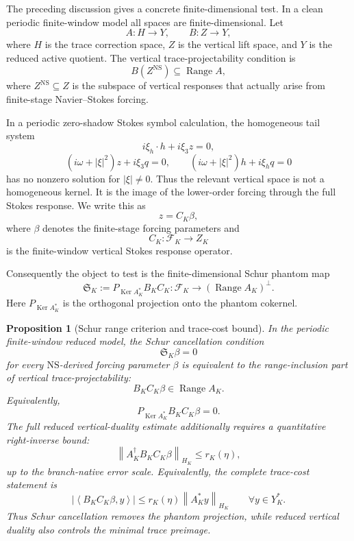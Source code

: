 \documentclass[11pt]{article}
\numberwithin{equation}{section}
\newtheorem{proposition}[theorem]{Proposition}
\DeclareMathOperator{\Range}{Range}
\DeclareMathOperator{\Ker}{Ker}
\newcommand{\NS}{\mathrm{NS}}
\newcommand{\norm}[2]{\left\|#1\right\|_{#2}}
\newcommand{\ip}[2]{\left\langle #1,#2\right\rangle}
\begin{document}
The preceding discussion gives a concrete finite-dimensional test.  In a clean periodic finite-window model all spaces are finite-dimensional.  Let
\[
        A:H\to Y,
        \qquad B:Z\to Y,
\]
where \(H\) is the trace correction space, \(Z\) is the vertical lift space, and \(Y\) is the reduced active quotient.  The vertical trace-projectability condition is
\[
        B(Z^{\NS})\subseteq\Range A,
\]
where \(Z^{\NS}\subseteq Z\) is the subspace of vertical responses that actually arise from finite-stage Navier--Stokes forcing.

In a periodic zero-shadow Stokes symbol calculation, the homogeneous tail system
\[
        i\xi_h\cdot h+i\xi_3z=0,
\]
\[
        (i\omega+|\xi|^2)z+i\xi_3q=0,
        \qquad
        (i\omega+|\xi|^2)h+i\xi_hq=0
\]
has no nonzero solution for \(|\xi|\ne0\).  Thus the relevant vertical space is not a homogeneous kernel.  It is the image of the lower-order forcing through the full Stokes response.  We write this as
\[
        z=C_K\beta,
\]
where \(\beta\) denotes the finite-stage forcing parameters and
\[
        C_K:\mathcal F_K\to Z_K
\]
is the finite-window vertical Stokes response operator.

Consequently the object to test is the finite-dimensional Schur phantom map
\begin{equation}\label{eq:Schur-phantom-map}
        \mathfrak S_K
        :=P_{\Ker A_K^*}B_KC_K:
        \mathcal F_K\to (\Range A_K)^\perp.
\end{equation}
Here \(P_{\Ker A_K^*}\) is the orthogonal projection onto the phantom cokernel.

\begin{proposition}[Schur range criterion and trace-cost bound]\label{prop:Schur-criterion}
In the periodic finite-window reduced model, the Schur cancellation condition
\[
        \mathfrak S_K\beta=0
\]
for every \(\NS\)-derived forcing parameter \(\beta\) is equivalent to the \emph{range-inclusion} part of vertical trace-projectability:
\[
        B_KC_K\beta\in\Range A_K.
\]
Equivalently,
\[
        P_{\Ker A_K^*}B_KC_K\beta=0.
\]
The full reduced vertical-duality estimate additionally requires a quantitative right-inverse bound:
\[
        \norm{A_K^\dagger B_KC_K\beta}{H_K}
        \le r_K(\eta),
\]
up to the branch-native error scale.  Equivalently, the complete trace-cost statement is
\[
        |\ip{B_KC_K\beta}{y}|
        \le r_K(\eta)\norm{A_K^*y}{H_K}
        \qquad \forall y\in Y_K^*.
\]
Thus Schur cancellation removes the phantom projection, while reduced vertical duality also controls the minimal trace preimage.
\end{proposition}
\end{document}
